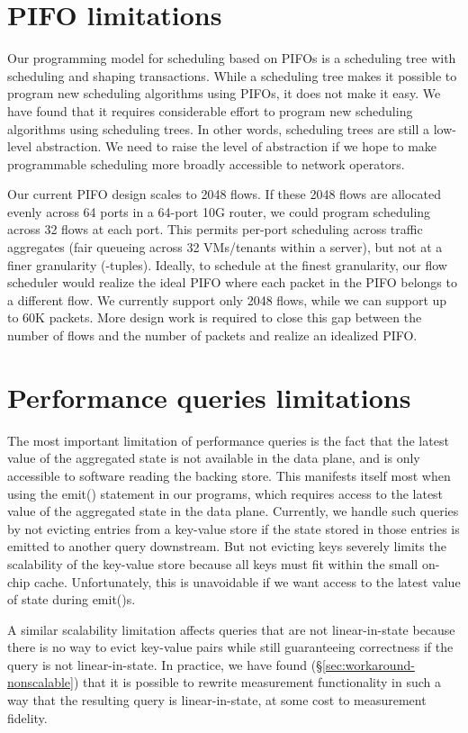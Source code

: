 \section{PIFO limitations}
\label{sec:pifo_limitations}

Our programming model for scheduling based on PIFOs is a scheduling tree with
scheduling and shaping transactions. While a scheduling tree makes it possible
to program new scheduling algorithms using PIFOs, it does not make it easy. We
have found that it requires considerable effort to program new scheduling
algorithms using scheduling trees.  In other words, scheduling trees are still
a low-level abstraction. We need to raise the level of abstraction if we hope
to make programmable scheduling more broadly accessible to network operators.

Our current PIFO design scales to 2048 flows. If these 2048 flows are allocated
evenly across 64 ports in a 64-port 10G router, we could program scheduling
across 32 flows at each port. This permits per-port scheduling across traffic
aggregates (\eg fair queueing across 32 VMs/tenants within a server), but not
at a finer granularity (-tuples). Ideally, to schedule at the finest
granularity, our flow scheduler would realize the ideal PIFO where each packet
in the PIFO belongs to a different flow. We currently support only 2048 flows,
while we can support up to 60K packets.  More design work is required to close
this gap between the number of flows and the number of packets and realize an
idealized PIFO.

\section{Performance queries limitations}
\label{sec:pq_limitations}

The most important limitation of performance queries is the fact that the
latest value of the aggregated state is not available in the data plane, and is
only accessible to software reading the backing store. This manifests itself
most when using the {\ct emit()} statement in our programs, which requires
access to the latest value of the aggregated state in the data plane.
Currently, we handle such queries by not evicting entries from a key-value
store if the state stored in those entries is emitted to another query
downstream. But not evicting keys severely limits the scalability of the
key-value store because all keys must fit within the small on-chip cache.
Unfortunately, this is unavoidable if we want access to the latest value of
state during {\ct emit()}s.

A similar scalability limitation affects queries that are not linear-in-state
because there is no way to evict key-value pairs while still guaranteeing
correctness if the query is not linear-in-state. In practice, we have found
(\S\ref{sec:workaround-nonscalable}) that it is possible to rewrite measurement
functionality in such a way that the resulting query is linear-in-state, at
some cost to measurement fidelity.
